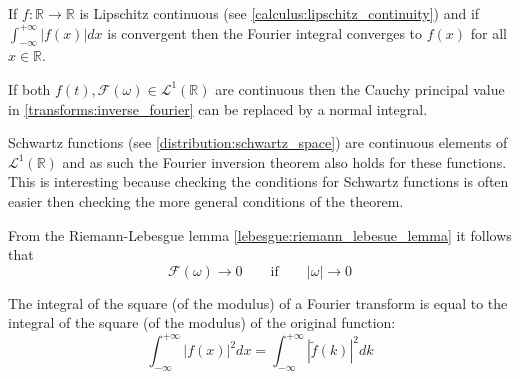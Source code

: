     \begin{theorem}
    	If $f:\mathbb{R}\rightarrow\mathbb{R}$ is Lipschitz continuous (see \ref{calculus:lipschitz_continuity}) and if $\int_{-\infty}^{+\infty}|f(x)|dx$ is convergent then the Fourier integral converges to $f(x)$ for all $x\in\mathbb{R}$.
    \end{theorem}
    \begin{theorem}
    	If both $f(t), \mathcal{F}(\omega)\in\mathcal{L}^1(\mathbb{R})$ are continuous then the Cauchy principal value in \ref{transforms:inverse_fourier} can be replaced by a normal integral.
    \end{theorem}
    \begin{remark}
    	Schwartz functions (see \ref{distribution:schwartz_space}) are continuous elements of $\mathcal{L}^1(\mathbb{R})$ and as such the Fourier inversion theorem also holds for these functions. This is interesting because checking the conditions for Schwartz functions is often easier then checking the more general conditions of the theorem.
    \end{remark}
    
    \begin{property}
    	From the Riemann-Lebesgue lemma \ref{lebesgue:riemann_lebesue_lemma} it follows that
        \begin{equation}
        	\mathcal{F}(\omega)\rightarrow0 \qquad\text{if}\qquad |\omega|\rightarrow0
        \end{equation}
    \end{property}
    
    \begin{result}
    	The integral of the square (of the modulus) of a Fourier transform is equal to the integral of the square (of the modulus) of the original function:
    	\begin{equation}
    		\label{transforms:plancherel_theorem}
            \int_{-\infty}^{+\infty}|f(x)|^2dx = \int_{-\infty}^{+\infty}|\widetilde{f}(k)|^2dk
    	\end{equation}
    \end{result}
    
